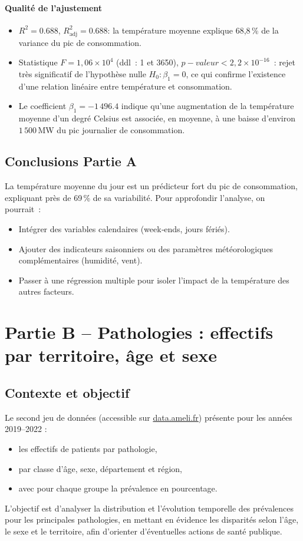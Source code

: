 \documentclass[12pt,a4paper]{article}
\begin{document}
\paragraph{Qualité de l’ajustement}
\begin{itemize}
  \item $R^2 = 0.688$, $R^2_{\mathrm{adj}} = 0.688$: la température moyenne explique 68,8\,\% de la variance du pic de consommation.
  \item Statistique $F = 1{,}06 \times 10^4$ (ddl : 1 et 3650), $p-valeur < 2{,}2\times10^{-16}$ : rejet très significatif de l’hypothèse nulle $H_0: \beta_1 = 0$, ce qui confirme l’existence d’une relation linéaire entre température et consommation.
  \item Le coefficient $\beta_1 = -1\,496.4$ indique qu’une augmentation de la température moyenne d’un degré Celsius est associée, en moyenne, à une baisse d’environ $1\,500\,$MW du pic journalier de consommation.
\end{itemize}

\subsection{Conclusions Partie A}
La température moyenne du jour est un prédicteur fort du pic de consommation, expliquant près de 69\,\% de sa variabilité.  
Pour approfondir l’analyse, on pourrait :
\begin{itemize}
  \item Intégrer des variables calendaires (week‑ends, jours fériés).
  \item Ajouter des indicateurs saisonniers ou des paramètres météorologiques complémentaires (humidité, vent).
  \item Passer à une régression multiple pour isoler l’impact de la température des autres facteurs.
\end{itemize}
\newpage
\section{Partie B -- Pathologies : effectifs par territoire, âge et sexe}
\subsection{Contexte et objectif}
Le second jeu de données (accessible sur \href{https://data.ameli.fr/explore/dataset/effectifs/information/}{data.ameli.fr}) présente pour les années 2019--2022 :
\begin{itemize}
  \item les effectifs de patients par pathologie,
  \item par classe d'âge, sexe, département et région,
  \item avec pour chaque groupe la prévalence en pourcentage.
\end{itemize}
L'objectif est d'analyser la distribution et l’évolution temporelle des prévalences pour les principales pathologies,  
en mettant en évidence les disparités selon l’âge, le sexe et le territoire, afin d’orienter d’éventuelles actions de santé publique. 
\end{document}
